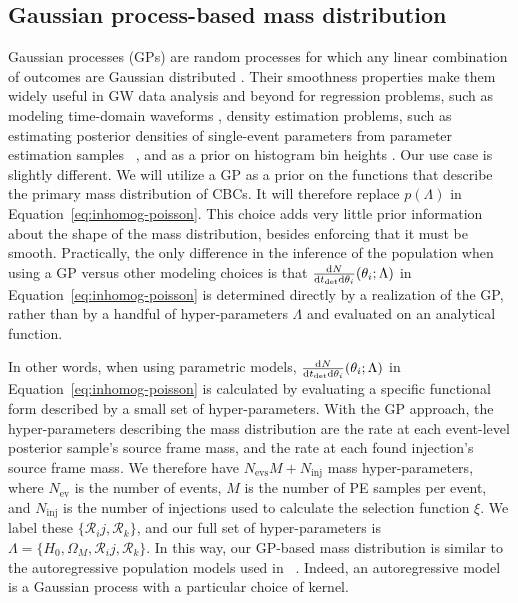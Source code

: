 \documentclass[]{aastex631}
\begin{document}
\subsection{Gaussian process-based mass distribution}
\label{sec:model}
Gaussian processes (GPs) are random processes for which any linear combination of outcomes are Gaussian distributed \citep{rasmussen_gaussian_2006}.
Their smoothness properties make them widely useful in GW data analysis and beyond for regression problems, such as modeling time-domain waveforms \citep{zoheyr, huerta}, density estimation problems, such as estimating posterior densities of single-event parameters from parameter estimation samples ~\citep{dangelo}, and as a prior on histogram bin heights \citep{ray_2023,li_flexible_2021}.
Our use case is slightly different.
We will utilize a GP as a prior on the functions that describe the primary mass distribution of CBCs.
It will therefore replace $p(\Lambda)$ in Equation~\ref{eq:inhomog-poisson}.
This choice adds very little prior information about the shape of the mass distribution, besides enforcing that it must be smooth.
Practically, the only difference in the inference of the population when using a GP versus other modeling choices is that $\frac{\text{d} N}{\text{d} t_{\det} \text{d} \theta_i} (\theta_i;\Lambda)$ in Equation~\ref{eq:inhomog-poisson} is determined directly by a realization of the GP, rather than by a handful of hyper-parameters $\Lambda$ and evaluated on an analytical function.

In other words, when using parametric models, $\frac{\text{d} N}{\text{d} t_{\det} \text{d} \theta_i} (\theta_i;\Lambda)$ in Equation~\ref{eq:inhomog-poisson} is calculated by evaluating a specific functional form described by a small set of hyper-parameters. 
With the GP approach, the hyper-parameters describing the mass distribution are the rate at each event-level posterior sample's source frame mass, and the rate at each found injection's source frame mass.
We therefore have $N_{\text{evs}}M + N_{\text{inj}}$ mass hyper-parameters, where $N_{\text{ev}}$ is the number of events, $M$ is the number of PE samples per event, and $N_{\text{inj}}$ is the number of injections used to calculate the selection function $\xi$.
We label these $\{\mathcal{R}_ij,\mathcal{R}_k\}$, and our full set of hyper-parameters is $\Lambda=\{H_0, \Omega_M, \mathcal{R}_ij,\mathcal{R}_k\}$. 
In this way, our GP-based mass distribution is similar to the autoregressive population models used in ~\citet{callister_ar}.
Indeed, an autoregressive model is a Gaussian process with a particular choice of kernel.
\end{document}
